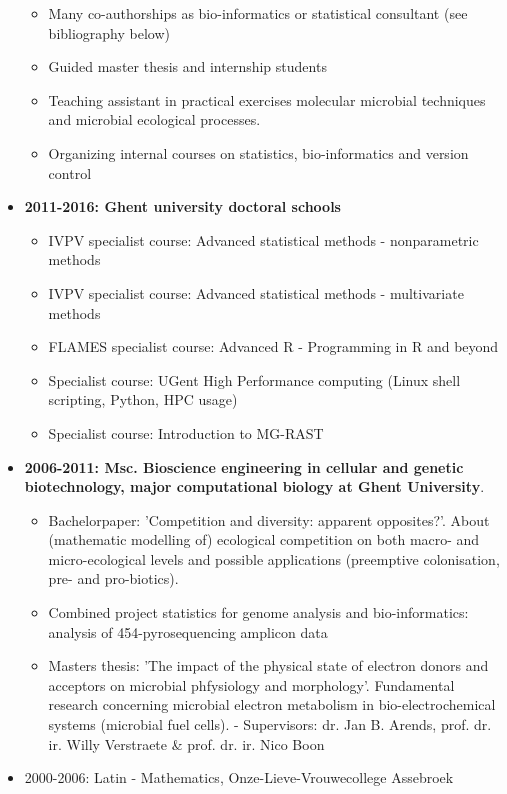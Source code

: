 \documentclass[a4paper,11pt,oneside]{article}
\begin{document}
\begin{itemize}
\begin{itemize}
      \item Many co-authorships as bio-informatics or statistical consultant  (see bibliography below)
      \item Guided master thesis and internship students
      \item Teaching assistant in practical exercises molecular microbial techniques and microbial ecological processes.
      \item Organizing internal courses on statistics, bio-informatics and version control
    \end{itemize}
\item \textbf{2011-2016: Ghent university doctoral schools}
    \begin{itemize}
      \item IVPV specialist course: Advanced statistical methods - nonparametric methods
      \item IVPV specialist course: Advanced statistical methods - multivariate methods
      \item FLAMES specialist course: Advanced R - Programming in R and beyond
      \item Specialist course: UGent High Performance computing (Linux shell scripting, Python, HPC usage)
      \item Specialist course: Introduction to MG-RAST
    \end{itemize}
\item \textbf{2006-2011: Msc. Bioscience engineering in cellular and genetic biotechnology, major computational biology at Ghent University}. 
	\begin{itemize}
		\item Bachelorpaper: 'Competition and diversity: apparent opposites?'. About (mathematic modelling of) ecological competition on both macro- and micro-ecological levels and possible applications (preemptive colonisation, pre- and pro-biotics).
		\item Combined project statistics for genome analysis and bio-informatics: analysis of 454-pyrosequencing amplicon data
		\item Masters thesis: 'The impact of the physical state of electron donors and acceptors on microbial phfysiology and morphology'. Fundamental research concerning microbial electron metabolism in bio-electrochemical systems (microbial fuel cells). - Supervisors: dr. Jan B. Arends, prof. dr. ir. Willy Verstraete \& prof. dr. ir. Nico Boon
	\end{itemize}
\item 2000-2006: Latin - Mathematics, Onze-Lieve-Vrouwecollege Assebroek
\end{itemize}
\end{document}
